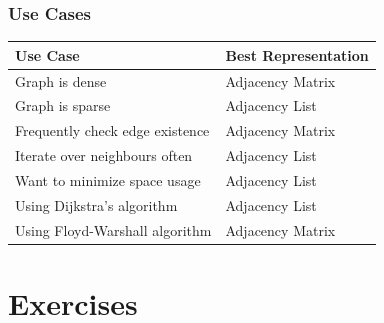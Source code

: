 \documentclass[11pt]{beamer}
\begin{document}
\begin{frame}\frametitle{Use Cases}
\centering
\begin{tabular}{@{} p{} l @{}}
\toprule
\textbf{Use Case} & \textbf{Best Representation} \\
\midrule
Graph is dense & Adjacency Matrix \\
Graph is sparse & Adjacency List \\
Frequently check edge existence & Adjacency Matrix \\
Iterate over neighbours often & Adjacency List \\
Want to minimize space usage & Adjacency List \\
Using Dijkstra's algorithm & Adjacency List \\
Using Floyd-Warshall algorithm & Adjacency Matrix \\
\bottomrule
\end{tabular}
\end{frame}

\section{Exercises}
\end{document}
